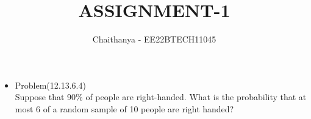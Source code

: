 \documentclass{article}
\title{ASSIGNMENT-1}
\author{Chaithanya - EE22BTECH11045 }
\begin{document}
\maketitle
\begin{itemize}
\item Problem(12.13.6.4)\\
Suppose that 90\% of people are right-handed. What is the probability that at most 6 of a random sample of 10 people are right handed?
\end{itemize}
\end{document}

